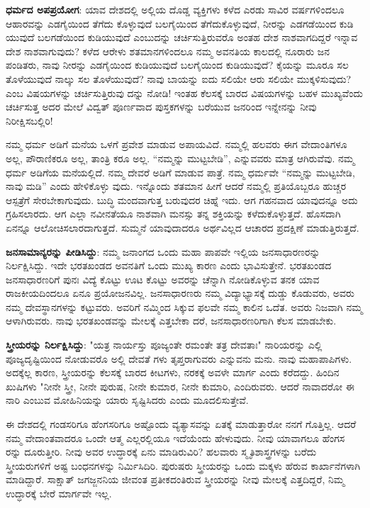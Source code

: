 \textbf{ಧರ್ಮದ ಅಪಪ್ರಯೋಗ}: ಯಾವ ದೇಶದಲ್ಲಿ ಅಲ್ಲಿಯ ದೊಡ್ಡ ವ್ಯಕ್ತಿಗಳು ಕಳೆದ ಎರಡು ಸಾವಿರ ವರ್ಷಗಳಿಂದಲೂ ಆಹಾರವನ್ನು ಎಡಗೈಯಿಂದ ತೆಗೆದು ಕೊಳ್ಳುವುದೆ ಬಲಗೈಯಿಂದ ತೆಗೆದುಕೊಳ್ಳುವುದೆ, ನೀರನ್ನು ಎಡಗಡೆಯಿಂದ ಕುಡಿ ಯುವುದೆ ಬಲಗಡೆಯಿಂದ ಕುಡಿಯುವುದೆ ಎಂಬುದನ್ನು ಚರ್ಚಿಸುತ್ತಿರುವರೊ ಅಂತಹ ದೇಶ ನಾಶವಾಗದಿದ್ದರೆ ಇನ್ನಾವ ದೇಶ ನಾಶವಾಗುವುದು? ಕಳೆದ ಆರೇಳು ಶತಮಾನಗಳಿಂದಲೂ ನಮ್ಮ ಅವನತಿಯ ಕಾಲದಲ್ಲಿ ನೂರಾರು ಜನ ಪಂಡಿತರು, ನಾವು ನೀರನ್ನು ಎಡಗೈಯಿಂದ ಕುಡಿಯುವುದೆ ಬಲಗೈಯಿಂದ ಕುಡಿಯುವುದೆ? ಕೈಯನ್ನು ಮೂರೂ ಸಲ ತೊಳೆಯುವುದೆ ನಾಲ್ಕು ಸಲ ತೊಳೆಯುವುದೆ? ನಾವು ಬಾಯನ್ನು ಐದು ಸಲಿಯೇ ಆರು ಸಲಿಯೇ ಮುಕ್ಕಳಿಸುವುದು? ಎಂಬ ವಿಷಯಗಳನ್ನು ಚರ್ಚಿಸುತ್ತಿರುವು ದನ್ನು ನೋಡಿ! ಇಂತಹ ಕೆಲಸಕ್ಕೆ ಬಾರದ ವಿಷಯಗಳನ್ನು ಬಹಳ ಮುಖ್ಯವೆಂದು ಚರ್ಚಿಸುತ್ತ ಅದರ ಮೇಲೆ ವಿದ್ವತ್ ಪೂರ್ಣವಾದ ಪುಸ್ತಕಗಳನ್ನು ಬರೆಯುವ ಜನರಿಂದ ಇನ್ನೇನನ್ನು ನೀವು ನಿರೀಕ್ಷಿಸಬಲ್ಲಿರಿ!

ನಮ್ಮ ಧರ್ಮ ಅಡಿಗೆ ಮನೆಯ ಒಳಗೆ ಪ್ರವೇಶ ಮಾಡುವ ಅಪಾಯವಿದೆ. ನಮ್ಮಲ್ಲಿ ಹಲವರು ಈಗ ವೇದಾಂತಿಗಳೂ ಅಲ್ಲ, ಪೌರಾಣಿಕರೂ ಅಲ್ಲ, ತಾಂತ್ರಿ ಕರೂ ಅಲ್ಲ. “ನಮ್ಮನ್ನು ಮುಟ್ಟಬೇಡಿ”, ಎನ್ನುವವರು ಮಾತ್ರ ಆಗಿರುವೆವು. ನಮ್ಮ ಧರ್ಮ ಅಡಿಗೆಯ ಮನೆಯಲ್ಲಿದೆ. ನಮ್ಮ ದೇವರೆ ಅಡಿಗೆ ಮಾಡುವ ಪಾತ್ರೆ. ನಮ್ಮ ಧರ್ಮವೇ “ನಮ್ಮನ್ನು ಮುಟ್ಟಬೇಡಿ, ನಾವು ಮಡಿ” ಎಂದು ಹೇಳಿಕೊಳ್ಳು ವುದು. ಇನ್ನೊಂದು ಶತಮಾನ ಹೀಗೆ ಆದರೆ ನಮ್ಮಲ್ಲಿ ಪ್ರತಿಯೊಬ್ಬರೂ ಹುಚ್ಚರ ಆಸ್ಪತ್ರೆಗೆ ಸೇರಬೇಕಾಗುವುದು. ಬುದ್ಧಿ ಮಂದವಾಗುತ್ತ ಬರುವುದರ ಚಿಹ್ನೆ ಇದು. ಆಗ ಗಹನವಾದ ಯಾವುದನ್ನೂ ಅದು ಗ್ರಹಿಸಲಾರದು. ಆಗ ಎಲ್ಲಾ ನವೀನತೆಯೂ ನಾಶವಾಗಿ ಮನಸ್ಸು ತನ್ನ ಶಕ್ತಿಯನ್ನು ಕಳೆದುಕೊಳ್ಳುತ್ತದೆ. ಹೊಸದಾಗಿ ಏನನ್ನೂ ಆಲೋಚಿಸಲಾರದಾಗುತ್ತದೆ. ಸುಮ್ಮನೆ ಯಾವುದಾದರೂ ಅರ್ಥವಿಲ್ಲದ ಆಚಾರದ ಪ್ರದಕ್ಷಿಣೆ ಮಾಡುತ್ತಿರುತ್ತದೆ.

\textbf{ಜನಸಾಮಾನ್ಯರನ್ನು ಪೀಡಿಸಿದ್ದು}: ನಮ್ಮ ಜನಾಂಗದ ಒಂದು ಮಹಾ ಪಾಪವೇ ಇಲ್ಲಿಯ ಜನಸಾಧಾರಣರನ್ನು ನಿರ್ಲಕ್ಷಿಸಿದ್ದು. ಇದೇ ಭರತಖಂಡದ ಅವನತಿಗೆ ಒಂದು ಮುಖ್ಯ ಕಾರಣ ಎಂದು ಭಾವಿಸುತ್ತೇನೆ. ಭರತಖಂಡದ ಜನಸಾಧಾರಣರಿಗೆ ಪುನಃ ವಿದ್ಯೆ ಕೊಟ್ಟು ಊಟ ಕೊಟ್ಟು ಅವರನ್ನು ಚೆನ್ನಾಗಿ ನೋಡಿಕೊಳ್ಳುವ ತನಕ ಯಾವ ರಾಜಕೀಯದಿಂದಲೂ ಏನೂ ಪ್ರಯೋಜನವಿಲ್ಲ. ಜನಸಾಧಾರಣರು ನಮ್ಮ ವಿದ್ಯಾಭ್ಯಾಸಕ್ಕೆ ದುಡ್ಡು ಕೊಡುವರು, ಅವರು ನಮ್ಮ ದೇವಸ್ಥಾನಗಳನ್ನು ಕಟ್ಟುವರು. ಅವರಿಗೆ ನಮ್ಮಿಂದ ಸಿಕ್ಕುವ ಫಲವೇ ನಮ್ಮ ಕಾಲಿನ ಒದೆತ. ಅವರು ನಿಜವಾಗಿ ನಮ್ಮ ಆಳಾಗಿರುವರು. ನಾವು ಭರತಖಂಡವನ್ನು ಮೇಲಕ್ಕೆ ಎತ್ತಬೇಕಾ ದರೆ, ಜನಸಾಧಾರಣರಿಗಾಗಿ ಕೆಲಸ ಮಾಡಬೇಕು.

\textbf{ಸ್ತ್ರೀಯರನ್ನು ನಿರ್ಲಕ್ಷಿಸಿದ್ದು}: "ಯತ್ರ ನಾರ್ಯಸ್ತು ಪೂಜ್ಯಂತೇ ರಮಂತೇ ತತ್ರ ದೇವತಾಃ" ನಾರಿಯರನ್ನು ಎಲ್ಲಿ ಪೂಜ್ಯದೃಷ್ಟಿಯಿಂದ ನೋಡುವರೊ ಅಲ್ಲಿ ದೇವತೆ ಗಳು ತೃಪ್ತರಾಗುವರು ಎನ್ನುವನು ಮನು. ನಾವು ಮಹಾಪಾಪಿಗಳು. ಅದಕ್ಕೆಲ್ಲ ಕಾರಣ, ಸ್ತ್ರೀಯರನ್ನು ಕೆಲಸಕ್ಕೆ ಬಾರದ ಕೀಟಗಳು, ನರಕಕ್ಕೆ ಅವಳೇ ಮಾರ್ಗ ಎಂದು ಕರೆದದ್ದು. ಹಿಂದಿನ ಖುಷಿಗಳು "ನೀನೇ ಸ್ತ್ರೀ, ನೀನೇ ಪುರುಷ, ನೀನೇ ಕುಮಾರ, ನೀನೇ ಕುಮಾರಿ, ಎಂದಿರುವರು. ಆದರೆ ನಾವಾದರೋ ಈ ನಾರಿ ಎಂಬುವ ಮೋಹಿನಿಯನ್ನು ಯಾರು ಸೃಷ್ಟಿಸಿದರು ಎಂದು ಮೂದಲಿಸುತ್ತೇವೆ.

ಈ ದೇಶದಲ್ಲಿ ಗಂಡಸರಿಗೂ ಹೆಂಗಸರಿಗೂ ಅಷ್ಟೊಂದು ವ್ಯತ್ಯಾಸವನ್ನು ಏತಕ್ಕೆ ಮಾಡುತ್ತಾರೋ ನನಗೆ ಗೊತ್ತಿಲ್ಲ. ಆದರೆ ನಮ್ಮ ವೇದಾಂತವಾದರೂ ಒಂದೇ ಆತ್ಮ ಎಲ್ಲರಲ್ಲಿಯೂ ಇದೆಯೆಂದು ಹೇಳುವುದು. ನೀವು ಯಾವಾಗಲೂ ಹೆಂಗಸ ರನ್ನು ದೂರುತ್ತೀರಿ. ನೀವು ಅವರ ಉದ್ಧಾರಕ್ಕೆ ಏನು ಮಾಡಿರುವಿರಿ? ಹಲವಾರು ಸ್ಮೃತಿಶಾಸ್ತ್ರಗಳನ್ನು ಬರೆದು ಸ್ತ್ರೀಯರುಗಳಿಗೆ ಅಷ್ಟ ಬಂಧನಗಳನ್ನು ನಿರ್ಮಿಸಿದಿರಿ. ಪುರುಷರು ಸ್ತ್ರೀಯರನ್ನು ಒಂದು ಮಕ್ಕಳು ಹೆರುವ ಕಾರ್ಖಾನೆಗಳಾಗಿ ಮಾಡಿದ್ದಾರೆ. ಸಾಕ್ಷಾತ್ ಜಗಜ್ಜನನಿಯ ಜೀವಂತ ಪ್ರತೀಕದಂತಿರುವ ಸ್ತ್ರೀಯರನ್ನು ನೀವು ಮೇಲಕ್ಕೆ ಎತ್ತದಿದ್ದರೆ, ನಿಮ್ಮ ಉದ್ಧಾರಕ್ಕೆ ಬೇರೆ ಮಾರ್ಗವೇ ಇಲ್ಲ.

